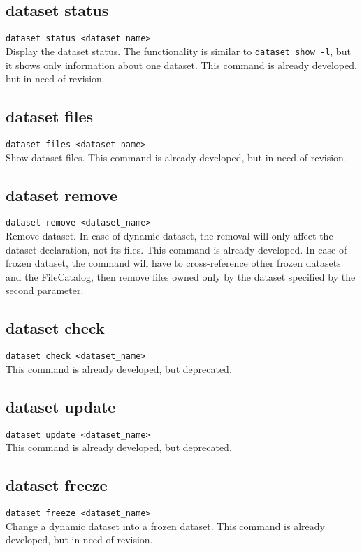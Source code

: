 \documentclass{scrreprt}
\begin{document}
\subsection{dataset status}
\texttt{dataset status <dataset_name>} \\
Display the dataset status. The functionality is similar to \texttt{dataset show -l}, but it shows only information about one dataset. This command is already developed, but in need of revision.

\subsection{dataset files}
\texttt{dataset files <dataset_name>} \\
Show dataset files. This command is already developed, but in need of revision.

\subsection{dataset remove}
\texttt{dataset remove <dataset_name>} \\
Remove dataset. In case of dynamic dataset, the removal will only affect the dataset declaration, not its files. This command is already developed. In case of frozen dataset, the command will have to cross-reference other frozen datasets and the FileCatalog, then remove files owned only by the dataset specified by the second parameter.

\subsection{dataset check}
\texttt{dataset check <dataset_name>} \\
This command is already developed, but deprecated.

\subsection{dataset update}
\texttt{dataset update <dataset_name>} \\
This command is already developed, but deprecated.

\subsection{dataset freeze}
\texttt{dataset freeze <dataset_name>} \\
Change a dynamic dataset into a frozen dataset. This command is already developed, but in need of revision.  
\end{document}
